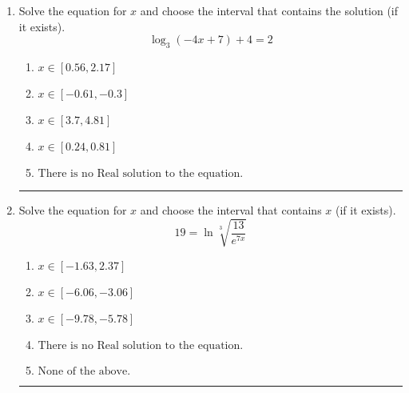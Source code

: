 \documentclass[14pt]{extbook}
\newcommand{\litem}[1]{\item#1\hspace*{-1cm}\rule{\textwidth}{0.4pt}}
\begin{document}
\begin{enumerate}
{\begin{enumerate}[label=\Alph*.]
\end{enumerate} }
\litem{
Solve the equation for $x$ and choose the interval that contains the solution (if it exists).\[ \log_{3}{(-4x+7)}+4 = 2 \]\begin{enumerate}[label=\Alph*.]
\item \( x \in [0.56, 2.17] \)
\item \( x \in [-0.61, -0.3] \)
\item \( x \in [3.7, 4.81] \)
\item \( x \in [0.24, 0.81] \)
\item \( \text{There is no Real solution to the equation.} \)

\end{enumerate} }
\litem{
 Solve the equation for $x$ and choose the interval that contains $x$ (if it exists).\[  19 = \ln{\sqrt[3]{\frac{13}{e^{7x}}}} \]\begin{enumerate}[label=\Alph*.]
\item \( x \in [-1.63, 2.37] \)
\item \( x \in [-6.06, -3.06] \)
\item \( x \in [-9.78, -5.78] \)
\item \( \text{There is no Real solution to the equation.} \)
\item \( \text{None of the above.} \)

\end{enumerate} }
\end{enumerate}
\end{document}
